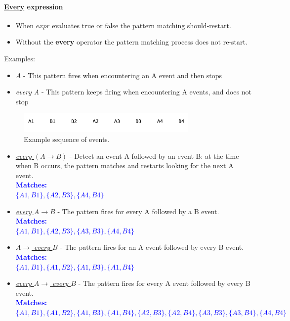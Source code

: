 \documentclass[10pt,a4paper]{article}
\begin{document}
\paragraph{\uline{Every} expression}
\begin{itemize}
	\item When $expr$ evaluates true or false the pattern matching should-restart.
	\item Without the \textbf{every} operator the pattern matching process does not re-start.
\end{itemize}
Examples:
\begin{itemize}
	\item $A$ - This pattern fires when encountering an A event and then stops
	\item \textit{every A} - This pattern keeps firing when encountering A events, and does not stop
\end{itemize}
\begin{figure}[ht!]
 \hfill \includegraphics[width=250pt]{images/events-sequence.png}\hspace*{\fill}
 \caption{Example sequence of events.}
\end{figure} 
\begin{itemize}
	\item \uline{\textit{every $(A \rightarrow B)$}} - Detect an event A followed by an event B: at the time when B occurs, the pattern matches and restarts looking for the next A event. \\
	\textcolor{blue}{\textbf{Matches:} \\ $\{A1,B1\}, \{A2,B3\}, \{A4,B4\}$}
	\item \uline{\textit{every $A \rightarrow B$}} - The pattern fires for every A followed by a B event.  \\
	\textcolor{blue}{\textbf{Matches:} \\ $\{A1,B1\}, \{A2,B3\}, \{A3,B3\}, \{A4,B4\}$}
	\item \uline{\textit{$A \rightarrow$ every $B$}} - The pattern fires for an A event followed by every B event. \\
	\textcolor{blue}{\textbf{Matches:} \\ $\{A1,B1\}, \{A1,B2\}, \{A1,B3\}, \{A1,B4\}$}
	\item \uline{\textit{every $A \rightarrow$ every $B$}} - The pattern fires for every A event followed by every B event. \\
	\textcolor{blue}{\textbf{Matches:} $\{A1,B1\}, \{A1,B2\}, \{A1,B3\}, \{A1,B4\}, \{A2,B3\}, \{A2,B4\}, \{A3,B3\}, \{A3,B4\}, \{A4,B4\} $}
\end{itemize}
\end{document}
